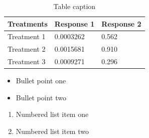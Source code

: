 \documentclass[preprint, 12pt]{elsarticle}
\begin{document}
\begin{table}[h]
\centering
\begin{tabular}{l l l}
\hline
\textbf{Treatments} & \textbf{Response 1} & \textbf{Response 2}\\
\hline
Treatment 1 & 0.0003262 & 0.562 \\
Treatment 2 & 0.0015681 & 0.910 \\
Treatment 3 & 0.0009271 & 0.296 \\
\hline
\end{tabular}
\caption{Table caption}
\end{table}

\begin{itemize}
\item Bullet point one
\item Bullet point two
\end{itemize}

\begin{enumerate}
\item Numbered list item one
\item Numbered list item two
\end{enumerate}













\end{document}
